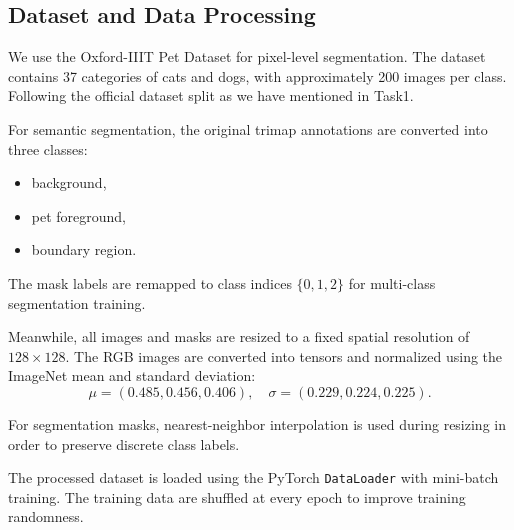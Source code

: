 \subsection{Dataset and Data Processing}
We use the Oxford-IIIT Pet Dataset for pixel-level segmentation. The dataset contains 37 categories
of cats and dogs, with approximately 200 images per class. Following the official dataset split as we have mentioned in Task1.

For semantic segmentation, the original trimap annotations are converted into three classes:
\begin{itemize}
    \item background,
    \item pet foreground,
    \item boundary region.
\end{itemize}

The mask labels are remapped to class indices $\{0,1,2\}$ for multi-class segmentation training.

Meanwhile, all images and masks are resized to a fixed spatial resolution of $128 \times 128$. The RGB images are converted into tensors and normalized using the ImageNet mean and standard deviation:
\[
\mu = (0.485, 0.456, 0.406), \quad
\sigma = (0.229, 0.224, 0.225).
\]

For segmentation masks, nearest-neighbor interpolation is used during resizing in order to preserve discrete class labels.

The processed dataset is loaded using the PyTorch \texttt{DataLoader} with mini-batch training. The training data are shuffled at every epoch to improve training randomness.